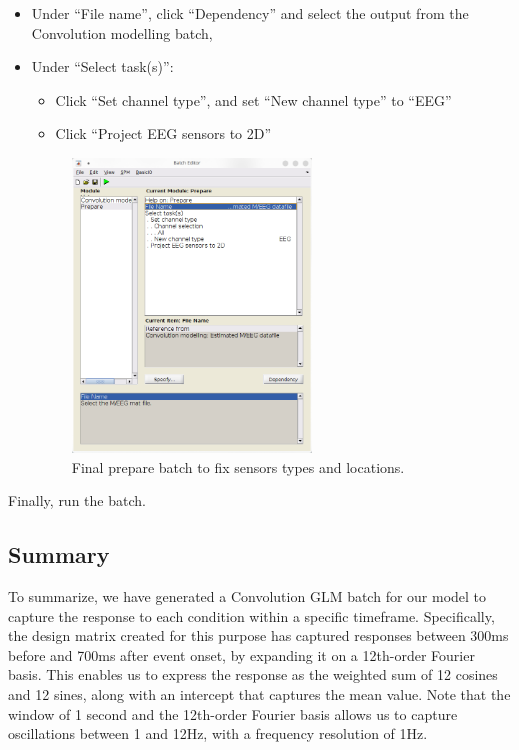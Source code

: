 		\begin{itemize}
			\item Under ``File name'', click ``Dependency'' and select the output from the Convolution modelling batch, 
			\item Under ``Select task(s)'': 
			\begin{itemize}
				\item Click ``Set channel type'', and set ``New channel type'' to ``EEG''
				\item Click ``Project EEG sensors to 2D''
			\end{itemize}
			\begin{figure}[htb]
			 	\centering
			 	\includegraphics[width=0.6\textwidth]{meeg_firstlevel/figures/prepare-post-conv.png}
			 	\caption{Final prepare batch to fix sensors types and locations.}
			 	\label{fig:meeg-firstlevel:prepare-post-conv}
			 \end{figure}
		\end{itemize} 
		Finally, run the batch. 

	\subsection{Summary}
		To summarize, we have generated a Convolution GLM batch for our model to capture the response to each condition within a specific timeframe. Specifically, the design matrix created for this purpose has captured responses between 300ms before and 700ms after event onset, by expanding it on a 12th-order Fourier basis. This enables us to express the response as the weighted sum of 12 cosines and 12 sines, along with an intercept that captures the mean value. Note that the window of 1 second and the 12th-order Fourier basis allows us to capture oscillations between 1 and 12Hz, with a frequency resolution of 1Hz.

